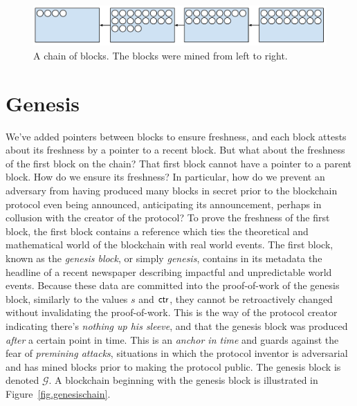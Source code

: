 \begin{figure}[h]
    \centering
    \includegraphics[width=1 \columnwidth,keepaspectratio]{figures/the-chain.pdf}
    \caption{A chain of blocks. The blocks were mined from left to right.}
    \label{fig.chain}
\end{figure}


\section{Genesis}

We've added pointers between blocks to ensure freshness, and each block attests about
its freshness by a pointer to a recent block. But what about the freshness of the first
block on the chain? That first block cannot have a pointer to a parent block. How do we
ensure its freshness? In particular, how do we prevent an adversary from having produced
many blocks in secret prior to the blockchain protocol even being announced, anticipating
its announcement, perhaps in collusion with the creator of the protocol? To prove the
freshness of the first block, the first block contains a reference which ties the theoretical
and mathematical world of the blockchain with real world events. The first block, known as
the \emph{genesis block}, or simply \emph{genesis}, contains in its metadata
the headline of a recent newspaper describing impactful and unpredictable world events.
Because these data are committed into the proof-of-work of the genesis block, similarly
to the values $s$ and $\mathsf{ctr}$, they cannot be retroactively changed without invalidating
the proof-of-work. This is the way of the protocol creator indicating there's
\emph{nothing up his sleeve}, and that the genesis block was produced \emph{after}
a certain point in time. This is an \emph{anchor in time} and guards against the fear
of \emph{premining attacks}, situations in which the protocol inventor
is adversarial and has mined blocks prior to making the protocol public. The genesis
block is denoted $\mathcal{G}$.
A blockchain beginning with the genesis block is illustrated in Figure~\ref{fig.genesischain}.

